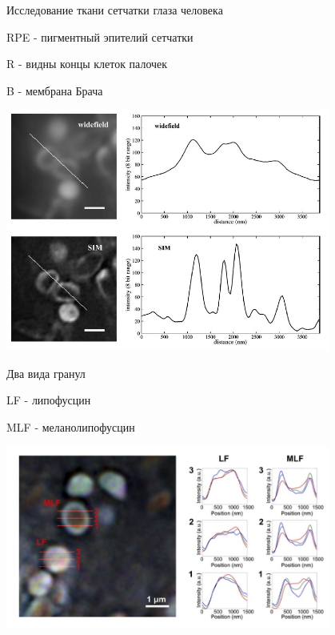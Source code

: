 \documentclass[9pt, compress, xcolor=table]{beamer}
\begin{document}
\begin{frame}{Исследование ткани сетчатки глаза человека}

RPE - пигментный эпителий сетчатки

R - видны концы клеток палочек 

B - мембрана Брача

\begin{center}
\includegraphics[width=0.8\textwidth]{sim12}
\end{center}

\end{frame}

\begin{frame}{Два вида гранул}

LF - липофусцин

MLF - меланолипофусцин

\begin{center}
\includegraphics[width=0.8\textwidth]{nlsim14}
\end{center}

\end{frame}

\end{document}
